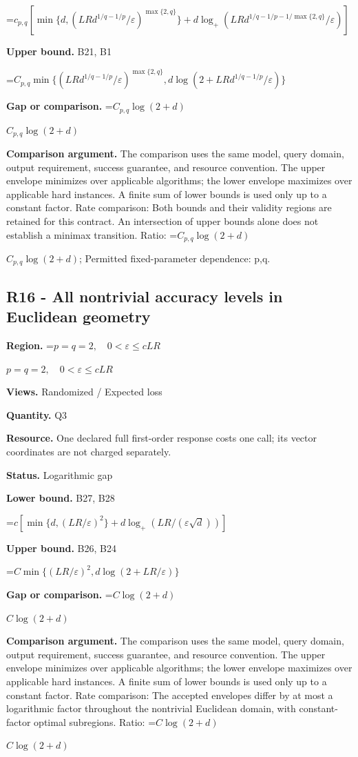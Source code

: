 \documentclass[10pt,a4paper]{article}
\newcommand{\AtlasMath}[1]{\par\begingroup\centering\setbox0=\hbox{$\displaystyle #1$}\ifdim\wd0>1.4\linewidth\typeout{ATLAS WIDE FORMULA: \the\wd0}\fi\ifdim\wd0>\linewidth\resizebox{\linewidth}{!}{\box0}\else\box0\fi\par\endgroup}
\newcommand{\AtlasInlineMath}[1]{\begingroup\setbox0=\hbox{$#1$}\ifdim\wd0>.4\linewidth\endgroup\AtlasMath{#1}\else\endgroup$#1$\fi}
\begin{document}
\AtlasMath{c_{p,q}[\min\{d,(LRd^{1/q-1/p}/\varepsilon)^{\max\{2,q\}}\}+d\log_+(LRd^{1/q-1/p-1/\max\{2,q\}}/\varepsilon)]}
\textbf{Upper bound.} B21, B1

\AtlasMath{C_{p,q}\min\{(LRd^{1/q-1/p}/\varepsilon)^{\max\{2,q\}},d\log(2+LRd^{1/q-1/p}/\varepsilon)\}}
\textbf{Gap or comparison.} \AtlasInlineMath{C_{p,q}\log(2+d)}

\textbf{Comparison argument.} The comparison uses the same model, query domain, output requirement, success guarantee, and resource convention. The upper envelope minimizes over applicable algorithms; the lower envelope maximizes over applicable hard instances. A finite sum of lower bounds is used only up to a constant factor. Rate comparison: Both bounds and their validity regions are retained for this contract. An intersection of upper bounds alone does not establish a minimax transition. Ratio: \AtlasInlineMath{C_{p,q}\log(2+d)}; Permitted fixed-parameter dependence: p,q.

\subsection{R16 - All nontrivial accuracy levels in Euclidean geometry}
\textbf{Region.} \AtlasInlineMath{p=q=2,\quad0<\varepsilon\le cLR}

\textbf{Views.} Randomized / Expected loss

\textbf{Quantity.} Q3

\textbf{Resource.} One declared full first-order response costs one call; its vector coordinates are not charged separately.

\textbf{Status.} Logarithmic gap

\textbf{Lower bound.} B27, B28

\AtlasMath{c[\min\{d,(LR/\varepsilon)^2\}+d\log_+(LR/(\varepsilon\sqrt d))]}
\textbf{Upper bound.} B26, B24

\AtlasMath{C\min\{(LR/\varepsilon)^2,d\log(2+LR/\varepsilon)\}}
\textbf{Gap or comparison.} \AtlasInlineMath{C\log(2+d)}

\textbf{Comparison argument.} The comparison uses the same model, query domain, output requirement, success guarantee, and resource convention. The upper envelope minimizes over applicable algorithms; the lower envelope maximizes over applicable hard instances. A finite sum of lower bounds is used only up to a constant factor. Rate comparison: The accepted envelopes differ by at most a logarithmic factor throughout the nontrivial Euclidean domain, with constant-factor optimal subregions. Ratio: \AtlasInlineMath{C\log(2+d)}
\end{document}
